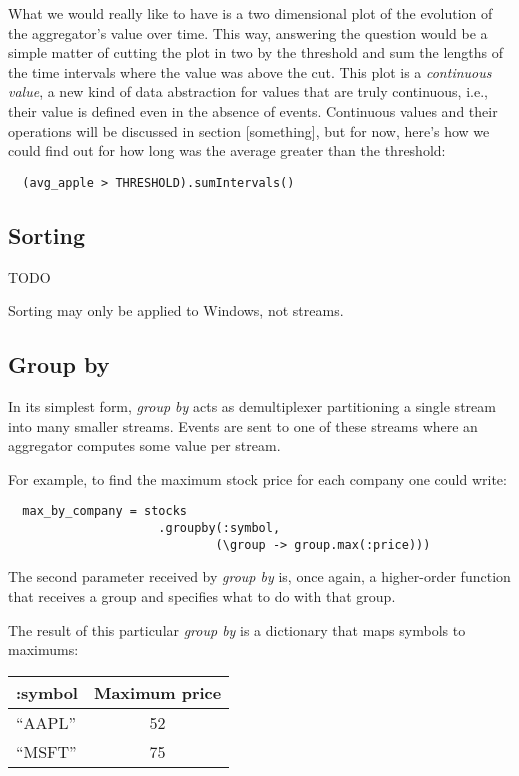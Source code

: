\documentclass{report}
\begin{document}
What we would really like to have is a two dimensional plot of the
evolution of the aggregator's value over time. This way, answering the
question would be a simple matter of cutting the plot in two by the
threshold and sum the lengths of the time intervals where the value
was above the cut. This plot is a \emph{continuous value}, a new kind
of data abstraction for values that are truly continuous, i.e., their
value is defined even in the absence of events. Continuous values and
their operations will be discussed in section [something], but for
now, here's how we could find out for how long was the average greater
than the threshold:

\begin{verbatim}
  (avg_apple > THRESHOLD).sumIntervals()
\end{verbatim}

\subsection{Sorting}
\label{sec:sorting}

TODO

Sorting may only be applied to Windows, not streams.

\subsection{Group by}
\label{sec:group-by}

In its simplest form, \emph{group by} acts as demultiplexer
partitioning a single stream into many smaller streams. Events are
sent to one of these streams where an aggregator computes some value
per stream.

For example, to find the maximum stock price for each company one
could write:

\begin{verbatim}
  max_by_company = stocks
                     .groupby(:symbol,
                             (\group -> group.max(:price)))
\end{verbatim}

The second parameter received by \emph{group by} is, once again, a
higher-order function that receives a group and specifies what to do
with that group.

The result of this particular \emph{group by} is a dictionary that
maps symbols to maximums:

\begin{tabular}{ |l|c| }
  \hline
  :symbol & Maximum price \\
  \hline
  ``AAPL'' & 52 \\
  ``MSFT'' & 75 \\
  \hline
\end{tabular}
\end{document}
